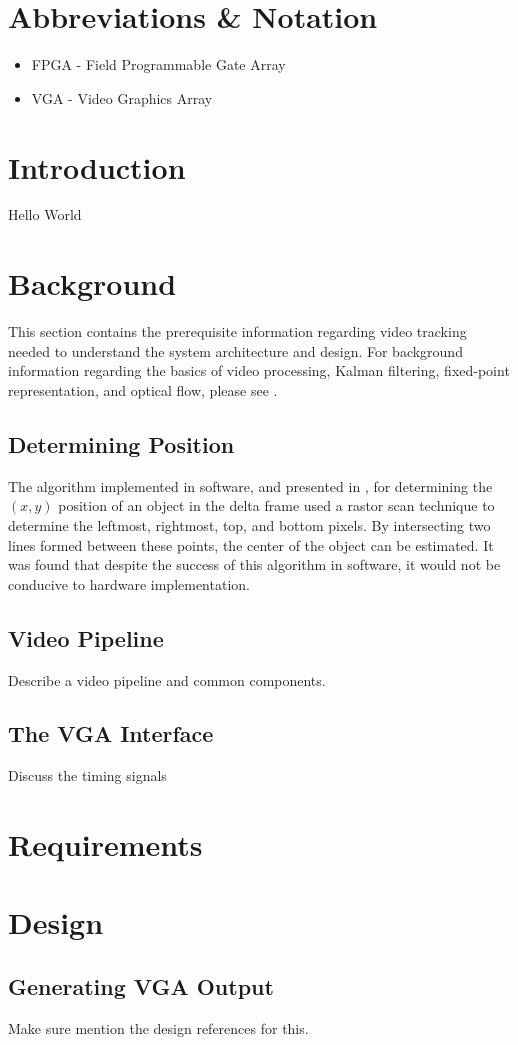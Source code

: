 \documentclass[11pt]{article} %
\begin{document}
\section{Abbreviations \& Notation}
\begin{itemize}
\item[] FPGA - Field Programmable Gate Array
\item[] VGA - Video Graphics Array
\end{itemize}
\section{Introduction}
Hello World
\section{Background}
This section contains the prerequisite information regarding video tracking needed to understand the system architecture and design. For background information regarding the basics of video processing, Kalman filtering, fixed-point representation, and optical flow, please see \cite{15}.
\subsection{Determining Position}
The algorithm implemented in software, and presented in \cite{15}, for determining the $(x,y)$ position of an object in the delta frame used a rastor scan technique to determine the leftmost, rightmost, top, and bottom pixels. By intersecting two lines formed between these points, the center of the object can be estimated. It was found that despite the success of this algorithm in software, it would not be conducive to hardware implementation.
\subsection{Video Pipeline}
Describe a video pipeline and common components.
\subsection{The VGA Interface}
Discuss the timing signals 
\section{Requirements}
\section{Design}
\subsection{Generating VGA Output}
Make sure mention the design references for this.
\end{document}
